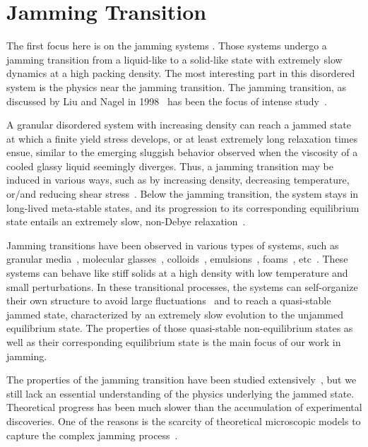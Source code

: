 \section{Jamming Transition}
\label{sec:jam_intro}
The first focus here is on the jamming systems \cite{Biroli2007}. Those systems undergo 
a jamming transition from a liquid-like to a solid-like state with extremely slow 
dynamics at a high packing density. The most interesting part in this 
disordered system is the physics near the jamming transition. 
The jamming transition, as discussed by Liu and
Nagel in 1998~\cite{Liu1998} has been the focus of
intense study~\cite{Biroli2007,Liu2010,Berthier2011}. 

A granular disordered system with increasing density can reach a jammed state at which a finite yield stress develops, or at least extremely long relaxation times
ensue, similar to the emerging sluggish behavior observed when the
viscosity of a cooled glassy liquid seemingly diverges. Thus, a jamming
transition may be induced in various ways, such as by increasing density,
decreasing temperature, or/and reducing shear stress~\cite{Liu2010}.
Below the jamming transition, the system stays in long-lived meta-stable
states, and its progression to its corresponding equilibrium state
entails an extremely slow, non-Debye relaxation~\cite{Hill1985, Ciamarra2010, van2010}.

Jamming transitions have been observed in various types of systems,
such as granular media~\cite{Majmudar2007}, molecular glasses~\cite{Parisi2010,Angelani2007},
colloids~\cite{Trappe2001}, emulsions~\cite{Zhang2005}, foams~\cite{Berthier2011,DaCruz2002},
etc~\cite{Liu2010,van2010}. These systems can behave like stiff solids
at a high density with low temperature and small perturbations. In
these transitional processes, the systems can self-organize their
own structure to avoid large fluctuations~\cite{Berthier2011} and
to reach a quasi-stable jammed state, characterized by an extremely
slow evolution to the unjammed equilibrium state. The properties of
those quasi-stable non-equilibrium states as well as their corresponding
equilibrium state is the main focus of our work in jamming. 


The properties of the jamming transition have been studied 
extensively~\cite{Biroli2007,Majmudar2007,Liu2010}, but we still lack an essential
understanding of the physics underlying the jammed state. Theoretical
progress has been much slower than the accumulation of experimental
discoveries. One of the reasons is the scarcity of theoretical microscopic
models to capture the complex jamming process~\cite{Krzakala2008,Jacquin2011}. 

